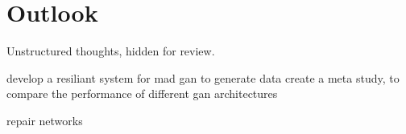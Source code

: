 \section{Outlook}\label{ausblick}

Unstructured thoughts, hidden for review. 

develop a resiliant system for mad gan to generate data
create a meta study, to compare the performance of different gan architectures


repair networks
\cite{Tanno2022repairingneuralnetworkfromcorrupt}




% 


% 



% 


% 


% 


% 


% 


